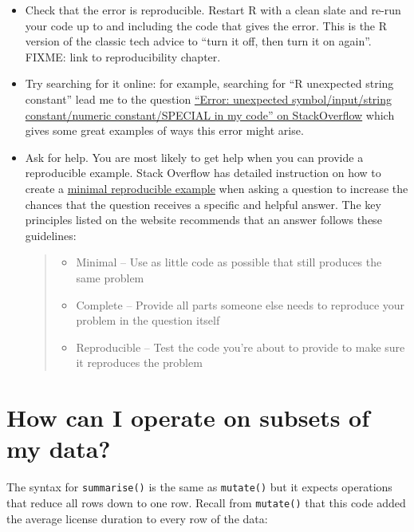 \documentclass[]{Nemilov}
\providecommand{\tightlist}{%
  \setlength{\itemsep}{0pt}\setlength{\parskip}{0pt}}
\begin{document}
\begin{itemize}
\item
  Check that the error is reproducible. Restart R with a clean slate and re-run your code up to and including the code that gives the error. This is the R version of the classic tech advice to ``turn it off, then turn it on again''. FIXME: link to reproducibility chapter.
\item
  Try searching for it online: for example, searching for ``R unexpected string constant'' lead me to the question \href{https://stackoverflow.com/questions/25889234/error-unexpected-symbol-input-string-constant-numeric-constant-special-in-my-co}{``Error: unexpected symbol/input/string constant/numeric constant/SPECIAL in my code'' on StackOverflow} which gives some great examples of ways this error might arise.
\item
  Ask for help. You are most likely to get help when you can provide a reproducible example. Stack Overflow
  has detailed instruction on how to create a \href{https://stackoverflow.com/help/minimal-reproducible-example}{minimal reproducible
  example} when asking a question to increase the chances that the
  question receives a specific and helpful answer. The key principles listed on
  the website recommends that an answer follows these guidelines:

  \begin{quote}
  \begin{itemize}
  \tightlist
  \item
    Minimal -- Use as little code as possible that still produces the same
    problem
  \item
    Complete -- Provide all parts someone else needs to reproduce your problem
    in the question itself
  \item
    Reproducible -- Test the code you're about to provide to make sure it
    reproduces the problem
  \end{itemize}
  \end{quote}
\end{itemize}

\hypertarget{how-can-i-operate-on-subsets-of-my-data}{%
\section{How can I operate on subsets of my data?}\label{how-can-i-operate-on-subsets-of-my-data}}

The syntax for \texttt{summarise()} is the same as \texttt{mutate()} but it expects operations that reduce all rows down to one row. Recall from \texttt{mutate()} that this code added the average license duration to every row of the data:
\end{document}
